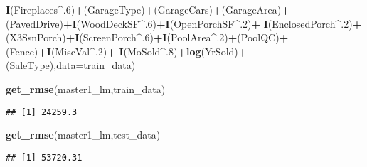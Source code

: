 \documentclass[]{article}
\newenvironment{Shaded}{\begin{snugshade}}{\end{snugshade}}
\newcommand{\DataTypeTok}[1]{\textcolor[rgb]{0.13,0.29,0.53}{#1}}
\newcommand{\DecValTok}[1]{\textcolor[rgb]{0.00,0.00,0.81}{#1}}
\newcommand{\KeywordTok}[1]{\textcolor[rgb]{0.13,0.29,0.53}{\textbf{#1}}}
\newcommand{\NormalTok}[1]{#1}
\newcommand{\OperatorTok}[1]{\textcolor[rgb]{0.81,0.36,0.00}{\textbf{#1}}}
\newcommand{\StringTok}[1]{\textcolor[rgb]{0.31,0.60,0.02}{#1}}
\begin{document}
\begin{Shaded}
\begin{Highlighting}[]
\StringTok{    }\KeywordTok{I}\NormalTok{(Fireplaces}\OperatorTok{^}\NormalTok{.}\DecValTok{6}\NormalTok{)}\OperatorTok{+}\NormalTok{(GarageType)}\OperatorTok{+}\NormalTok{(GarageCars)}\OperatorTok{+}\NormalTok{(GarageArea)}\OperatorTok{+}\NormalTok{(PavedDrive)}\OperatorTok{+}\KeywordTok{I}\NormalTok{(WoodDeckSF}\OperatorTok{^}\NormalTok{.}\DecValTok{6}\NormalTok{)}\OperatorTok{+}\KeywordTok{I}\NormalTok{(OpenPorchSF}\OperatorTok{^}\NormalTok{.}\DecValTok{2}\NormalTok{)}\OperatorTok{+}
\StringTok{    }\KeywordTok{I}\NormalTok{(EnclosedPorch}\OperatorTok{^}\NormalTok{.}\DecValTok{2}\NormalTok{)}\OperatorTok{+}\NormalTok{(X3SsnPorch)}\OperatorTok{+}\KeywordTok{I}\NormalTok{(ScreenPorch}\OperatorTok{^}\NormalTok{.}\DecValTok{6}\NormalTok{)}\OperatorTok{+}\KeywordTok{I}\NormalTok{(PoolArea}\OperatorTok{^}\NormalTok{.}\DecValTok{2}\NormalTok{)}\OperatorTok{+}\NormalTok{(PoolQC)}\OperatorTok{+}\NormalTok{(Fence)}\OperatorTok{+}\KeywordTok{I}\NormalTok{(MiscVal}\OperatorTok{^}\NormalTok{.}\DecValTok{2}\NormalTok{)}\OperatorTok{+}
\StringTok{    }\KeywordTok{I}\NormalTok{(MoSold}\OperatorTok{^}\NormalTok{.}\DecValTok{8}\NormalTok{)}\OperatorTok{+}\KeywordTok{log}\NormalTok{(YrSold)}\OperatorTok{+}\NormalTok{(SaleType),}\DataTypeTok{data=}\NormalTok{train_data)}

\KeywordTok{get_rmse}\NormalTok{(master1_lm,train_data)}
\end{Highlighting}
\end{Shaded}

\begin{verbatim}
## [1] 24259.3
\end{verbatim}

\begin{Shaded}
\begin{Highlighting}[]
\KeywordTok{get_rmse}\NormalTok{(master1_lm,test_data)}
\end{Highlighting}
\end{Shaded}

\begin{verbatim}
## [1] 53720.31
\end{verbatim}

\begin{Shaded}
\end{Shaded}
\end{document}
